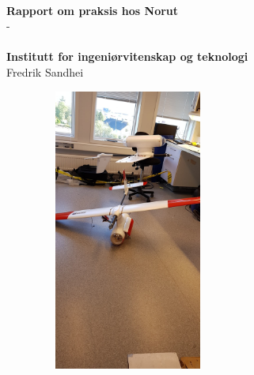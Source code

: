 \documentclass[12pt, a4paper]{article}
\begin{document}
\begin{titlepage}
\HRule \\[0.4cm]
{ \huge \bfseries Rapport om praksis hos Norut}\\[0.4cm] %
{\large {} \hspace{1cm} - \hspace{1cm}}\\[.55cm] %
\HRule \\[1.0 cm]

\textbf{Institutt for ingeniørvitenskap og teknologi}\\
\hspace{-6.3cm} Fredrik Sandhei\\[.25cm] %

\begin{figure}[h!]
	\centering
	\includegraphics[width = 6cm, height = 9.3cm]{bilder/andre_fly_ferdigstilt.jpg}
\end{figure}

\vfill %

\end{titlepage}

\date{\today}

\clearpage
\end{document}

